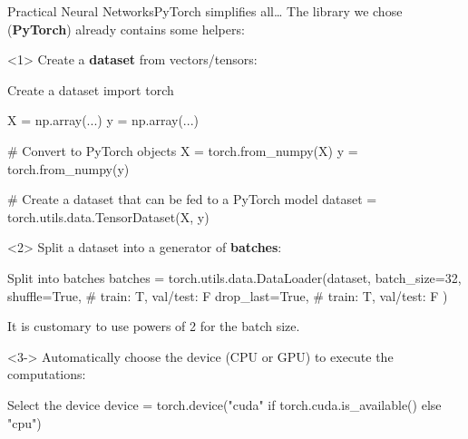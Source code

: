 \begin{frame}[fragile]{Practical Neural Networks}{PyTorch simplifies all\dots}
    The library we chose (\textbf{PyTorch}) already contains some helpers:

    \vfill

    \begin{onlyenv}<1>
        Create a \textbf{dataset} from vectors/tensors:
        \begin{codewithcard}{Create a dataset}
import torch

X = np.array(...)
y = np.array(...)

# Convert to PyTorch objects
X = torch.from_numpy(X)
y = torch.from_numpy(y)

# Create a dataset that can be fed to a PyTorch model
dataset = torch.utils.data.TensorDataset(X, y)
        \end{codewithcard}
    \end{onlyenv}

    \begin{onlyenv}<2>
        Split a dataset into a generator of \textbf{batches}:
        \begin{codewithcard}{Split into batches}
batches = torch.utils.data.DataLoader(dataset,
                                      batch_size=32,
                                      shuffle=True,  # train: T, val/test: F
                                      drop_last=True,  # train: T, val/test: F
                                    )
        \end{codewithcard}

        \vfill
        {\tiny It is customary to use powers of 2 for the batch size.}
    \end{onlyenv}

    \begin{onlyenv}<3->
        Automatically choose the device (CPU or GPU) to execute the computations:
        \begin{codewithcard}{Select the device}
device = torch.device("cuda" if torch.cuda.is_available() else "cpu")
        \end{codewithcard}
    \end{onlyenv}
\end{frame}

